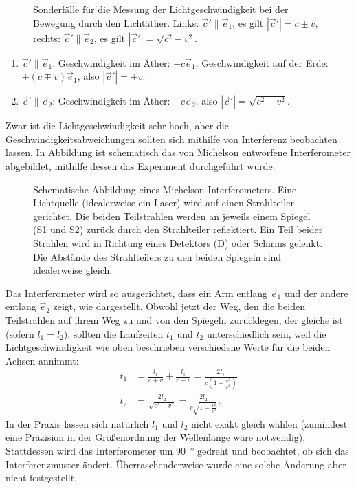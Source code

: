 \begin{figure}[htp]
    \centering
    \tfigMeasurementDirections
    \caption{Sonderfälle für die Messung der Lichtgeschwindigkeit bei der Bewegung durch den Lichtäther. Links: $\vec c'\parallel\vec e_1$, es gilt $|\vec c'|=c\pm v$, rechts: $\vec c'\parallel \vec e_2$, es gilt $|\vec c'|=\sqrt{c^2-v^2}$.}
    \label{fig:bewegung_durch_lichtaetherB}
\end{figure}

\begin{enumerate}
    \item $\vec c'\parallel \vec e_1$: Geschwindigkeit im Äther: $\pm c \vec e_1$, Geschwindigkeit auf der Erde: $\pm(c\mp v)\vec e_1$, also $|\vec c'|=\pm v$.
    \item $\vec c'\parallel \vec e_2$: Geschwindigkeit im Äther: $\pm c \vec e_2$, also $|\vec c'|=\sqrt{c^2-v^2}$.
\end{enumerate}


Zwar ist die Lichtgeschwindigkeit sehr hoch, aber die Geschwindigkeitsabweichungen sollten sich mithilfe von Interferenz beobachten lassen. In Abbildung  ist schematisch das von Michelson entworfene Interferometer abgebildet, mithilfe dessen das Experiment durchgeführt wurde.

\begin{figure}[htb]
    \centering
    \tfigMichelsonInterferometer
    \caption{Schematische Abbildung eines Michelson-Interferometers. Eine Lichtquelle (idealerweise ein Laser) wird auf einen Strahlteiler gerichtet. Die beiden Teilstrahlen werden an jeweils einem Spiegel (S1 und S2) zurück durch den Strahlteiler reflektiert. Ein Teil beider Strahlen wird in Richtung eines Detektors (D) oder Schirms gelenkt. Die Abstände des Strahlteilers zu den beiden Spiegeln sind idealerweise gleich. }
    \label{fig:michelson_interferometer}
\end{figure}

Das Interferometer wird so ausgerichtet, dass ein Arm entlang $\vec e_1$ und der andere entlang $\vec e_2$ zeigt, wie dargestellt.
Obwohl jetzt der Weg, den die beiden Teilstrahlen auf ihrem Weg zu und von den Spiegeln zurücklegen, der gleiche ist (sofern $l_1=l_2$), sollten die Laufzeiten $t_1$ und $t_2$ unterschiedlich sein, weil die Lichtgeschwindigkeit wie oben beschrieben verschiedene Werte für die beiden Achsen annimmt:
\begin{align*}
    t_1 & = \frac{l_1}{c+v}+\frac{l_1}{c-v}=\frac{2l_1}{c\left(1-\frac{v^2}{c^2}\right)} \\
    t_2 & = \frac{2l_2}{\sqrt{c^2-v^2}} = \frac{2l_2}{c\sqrt{1-\frac{v^2}{c^2}}}.
\end{align*}
In der Praxis lassen sich natürlich $l_1$ und $l_2$ nicht exakt gleich wählen (zumindest eine Präzision in der Größenordnung der Wellenlänge wäre notwendig). Stattdessen wird das Interferometer um \SI{90}{\degree} gedreht und beobachtet, ob sich das Interferenzmuster ändert.
Überraschenderweise wurde eine solche Änderung aber nicht festgestellt.

